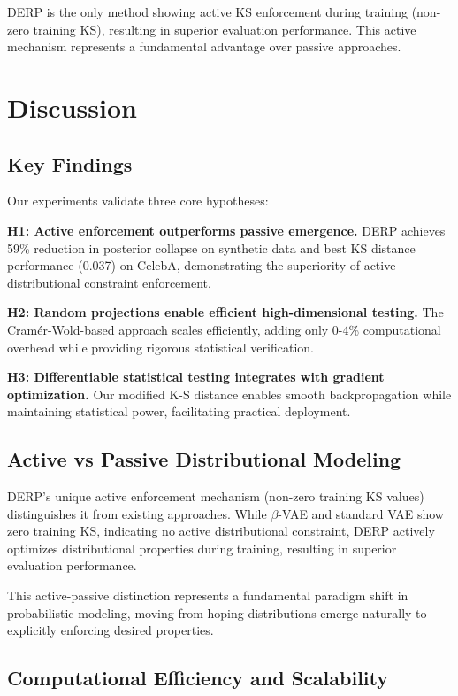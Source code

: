 \documentclass[11pt]{article}
\begin{document}
DERP is the only method showing active KS enforcement during training (non-zero training KS), resulting in superior evaluation performance. This active mechanism represents a fundamental advantage over passive approaches.

\section{Discussion}

\subsection{Key Findings}

Our experiments validate three core hypotheses:

\textbf{H1: Active enforcement outperforms passive emergence.} DERP achieves 59\% reduction in posterior collapse on synthetic data and best KS distance performance (0.037) on CelebA, demonstrating the superiority of active distributional constraint enforcement.

\textbf{H2: Random projections enable efficient high-dimensional testing.} The Cramér-Wold-based approach scales efficiently, adding only 0-4\% computational overhead while providing rigorous statistical verification.

\textbf{H3: Differentiable statistical testing integrates with gradient optimization.} Our modified K-S distance enables smooth backpropagation while maintaining statistical power, facilitating practical deployment.

\subsection{Active vs Passive Distributional Modeling}

DERP's unique active enforcement mechanism (non-zero training KS values) distinguishes it from existing approaches. While $\beta$-VAE and standard VAE show zero training KS, indicating no active distributional constraint, DERP actively optimizes distributional properties during training, resulting in superior evaluation performance.

This active-passive distinction represents a fundamental paradigm shift in probabilistic modeling, moving from hoping distributions emerge naturally to explicitly enforcing desired properties.

\subsection{Computational Efficiency and Scalability}
\end{document}
